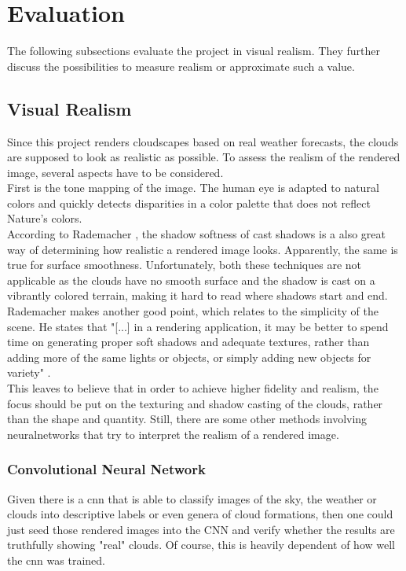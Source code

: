 \section{Evaluation}
The following subsections evaluate the project in visual realism.
They further discuss the possibilities to measure realism or approximate such a value.

\subsection{Visual Realism}
\label{section:techimpl:measure}
Since this project renders cloudscapes based on real weather forecasts, the clouds are supposed to look as realistic as possible.
To assess the realism of the rendered image, several aspects have to be considered.
\\
First is the tone mapping of the image. The human eye is adapted to natural colors and quickly detects disparities in a color palette that does not reflect Nature's colors.
\\
According to Rademacher \cite{diglib:realism}, the shadow softness of cast shadows is a also great way of determining how realistic a rendered image looks.
Apparently, the same is true for surface smoothness.
Unfortunately, both these techniques are not applicable as the clouds have no smooth surface and the shadow is cast on a vibrantly colored terrain, making it hard to read where shadows start and end.
\\
Rademacher makes another good point, which relates to the simplicity of the scene.
He states that "[...] in a rendering application, it may be better to spend time on generating proper soft shadows and adequate textures, rather than adding more of the same lights
or objects, or simply adding new objects for variety" \cite{diglib:realism2}.
\\
This leaves to believe that in order to achieve higher fidelity and realism, the focus should be put on the texturing and shadow casting of the clouds, rather than the shape and quantity.
\emptyline
Still, there are some other methods involving \gls{neuralnetwork}s that try to interpret the realism of a rendered image.

\subsubsection{Convolutional Neural Network}
Given there is a \gls{cnn} that is able to classify images of the sky, the weather or clouds into descriptive labels or even genera of cloud formations, then one could just seed those rendered images into the CNN and verify whether the results are truthfully showing "real" clouds.
Of course, this is heavily dependent of how well the \gls{cnn} was trained.

